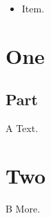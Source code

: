 \documentclass[9pt]{beamer}
\begin{document}
\begin{frame}
\tableofcontents
\begin{itemize}
\item Item.
\end{itemize}
\end{frame}
\section{One}
\subsection{Part}
\begin{frame}{A}
Text.
\end{frame}
\section{Two}
\begin{frame}{B}
More.
\end{frame}
\end{document}
